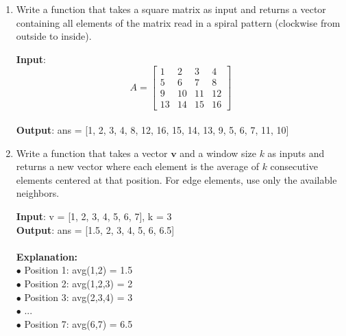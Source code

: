 \documentclass[oneside]{article}
\begin{document}
\begin{enumerate}
	\item
	      Write a function that takes a square matrix as input and returns a vector containing all elements of the matrix read in a spiral pattern (clockwise from outside to inside).
	      \begin{tcolorbox}[blanker, breakable, left=5mm, before skip=10pt, after skip=10pt, borderline west={1mm}{0pt}{primarycolor}]
		      \textbf{Input}: \begin{equation*}
			      A = \begin{bmatrix}
				      1  & 2  & 3  & 4  \\
				      5  & 6  & 7  & 8  \\
				      9  & 10 & 11 & 12 \\
				      13 & 14 & 15 & 16
			      \end{bmatrix}
		      \end{equation*} \\
		      \textbf{Output}: ans = [1, 2, 3, 4, 8, 12, 16, 15, 14, 13, 9, 5, 6, 7, 11, 10]
	      \end{tcolorbox}

	\item
	      Write a function that takes a vector $\mathbf{v}$ and a window size $k$ as inputs and returns a new vector where each element is the average of $k$ consecutive elements centered at that position. For edge elements, use only the available neighbors.
	      \begin{tcolorbox}[blanker, breakable, left=5mm, before skip=10pt, after skip=10pt, borderline west={1mm}{0pt}{primarycolor}]
		      \textbf{Input}: v = [1, 2, 3, 4, 5, 6, 7], k = 3 \\
		      \textbf{Output}: ans = [1.5, 2, 3, 4, 5, 6, 6.5] \\
		      \\
		      \textbf{Explanation:}\\
		      $\bullet$ Position 1: avg(1,2) = 1.5\\
		      $\bullet$ Position 2: avg(1,2,3) = 2\\
		      $\bullet$ Position 3: avg(2,3,4) = 3\\
		      $\bullet$ ...\\
		      $\bullet$ Position 7: avg(6,7) = 6.5
	      \end{tcolorbox}


\end{enumerate}
\end{document}
